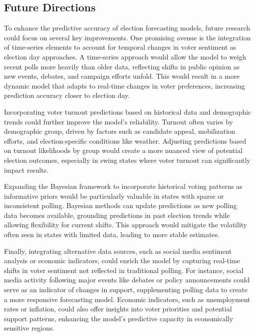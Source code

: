 \documentclass[
  letterpaper,
  DIV=11,
  numbers=noendperiod]{scrartcl}
\begin{document}
\subsection{Future Directions}\label{future-directions}

To enhance the predictive accuracy of election forecasting models,
future research could focus on several key improvements. One promising
avenue is the integration of time-series elements to account for
temporal changes in voter sentiment as election day approaches. A
time-series approach would allow the model to weigh recent polls more
heavily than older data, reflecting shifts in public opinion as new
events, debates, and campaign efforts unfold. This would result in a
more dynamic model that adapts to real-time changes in voter
preferences, increasing prediction accuracy closer to election day.

Incorporating voter turnout predictions based on historical data and
demographic trends could further improve the model's reliability.
Turnout often varies by demographic group, driven by factors such as
candidate appeal, mobilization efforts, and election-specific conditions
like weather. Adjusting predictions based on turnout likelihoods by
group would create a more nuanced view of potential election outcomes,
especially in swing states where voter turnout can significantly impact
results.

Expanding the Bayesian framework to incorporate historical voting
patterns as informative priors would be particularly valuable in states
with sparse or inconsistent polling. Bayesian methods can update
predictions as new polling data becomes available, grounding predictions
in past election trends while allowing flexibility for current shifts.
This approach would mitigate the volatility often seen in states with
limited data, leading to more stable estimates.

Finally, integrating alternative data sources, such as social media
sentiment analysis or economic indicators, could enrich the model by
capturing real-time shifts in voter sentiment not reflected in
traditional polling. For instance, social media activity following major
events like debates or policy announcements could serve as an indicator
of changes in support, supplementing polling data to create a more
responsive forecasting model. Economic indicators, such as unemployment
rates or inflation, could also offer insights into voter priorities and
potential support patterns, enhancing the model's predictive capacity in
economically sensitive regions.
\end{document}
